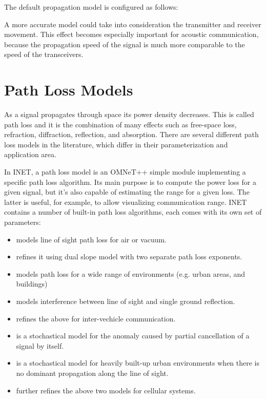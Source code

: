 The default propagation model is configured as follows:


A more accurate model could take into consideration the transmitter and
receiver movement. This effect becomes especially important for acoustic
communication, because the propagation speed of the signal is much more
comparable to the speed of the transceivers.

\section{Path Loss Models}

As a signal propagates through space its power density decreases. This is
called path loss and it is the combination of many effects such as
free-space loss, refraction, diffraction, reflection, and absorption. There
are several different path loss models in the literature, which differ in
their parameterization and application area.

In INET, a path loss model is an OMNeT++ simple module implementing a
specific path loss algorithm. Its main purpose is to compute the power loss
for a given signal, but it's also capable of estimating the range for a
given loss. The latter is useful, for example, to allow visualizing
communication range. INET contains a number of built-in path loss
algorithms, each comes with its own set of parameters:

\begin{itemize}
        \item {} models line of sight path loss for air or vacuum.
        \item {} refines it using dual slope model with two separate path loss exponents.
        \item {} models path loss for a wide range of environments (e.g. urban areas, and buildings)
        \item {} models interference between line of sight and single ground reflection.
        \item {} refines the above for inter-vechicle communication.
        \item {} is a stochastical model for the anomaly caused by partial cancellation of a signal by itself.
        \item {} is a stochastical model for heavily built-up urban environments when there is no dominant propagation along the line of sight.
        \item {} further refines the above two models for cellular systems.
\end{itemize}

